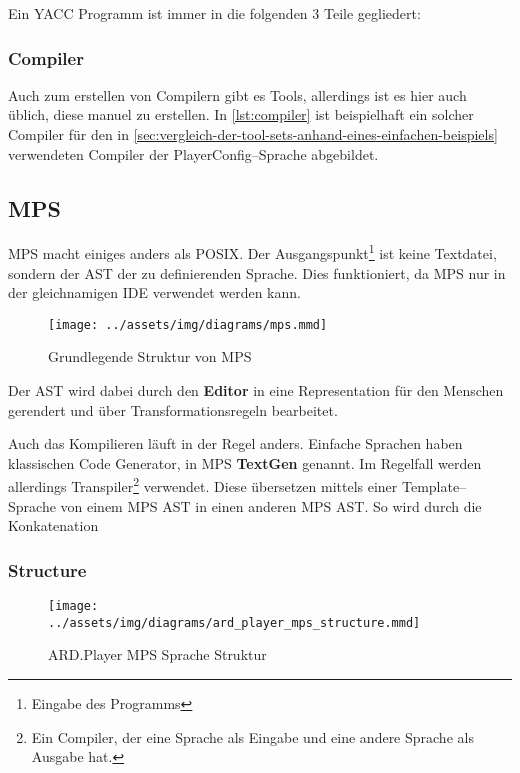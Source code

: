 Ein \ac{YACC} Programm ist immer in die folgenden 3 Teile gegliedert:

\lipsum[5]

\subsubsection{Compiler}
Auch zum erstellen von Compilern gibt es Tools, allerdings ist es hier auch üblich, diese manuel zu erstellen.
In \autoref{lst:compiler} ist beispielhaft ein solcher Compiler für den in \autoref{sec:vergleich-der-tool-sets-anhand-eines-einfachen-beispiels} verwendeten Compiler der PlayerConfig--Sprache abgebildet.

\lipsum[5]

\subsection{\acl{MPS}}\label{subsec:meta-programming-system}
\ac{MPS} macht einiges anders als \ac{POSIX}.
Der Ausgangspunkt\footnote{Eingabe des Programms} ist keine Textdatei, sondern der \ac{AST} der zu definierenden Sprache.
Dies funktioniert, da \ac{MPS} nur in der gleichnamigen \ac{IDE} verwendet werden kann.

\begin{wrapfigure}{lH}{0.5\textwidth}
    \begin{center}
        \texttt{[image: ../assets/img/diagrams/mps.mmd]}
    \end{center}
    \caption{Grundlegende Struktur von \acs{MPS}}
    \label{fig:mps}
\end{wrapfigure}
Der \ac{AST} wird dabei durch den \textbf{Editor} in eine Representation für den Menschen gerendert und über Transformationsregeln bearbeitet.

Auch das Kompilieren läuft in der Regel anders.
Einfache Sprachen haben klassischen Code Generator, in \ac{MPS} \textbf{TextGen} genannt.
Im Regelfall werden allerdings Transpiler\footnote{Ein Compiler, der eine Sprache als Eingabe und eine andere Sprache als Ausgabe hat.} verwendet.
Diese übersetzen mittels einer Template--Sprache von einem \ac{MPS} \ac{AST} in einen anderen \ac{MPS} \ac{AST}.
So wird durch die Konkatenation

\lipsum[5]

\subsubsection{Structure}
\begin{figure}
    \texttt{[image: ../assets/img/diagrams/ard\_player\_mps\_structure.mmd]}
    \caption{ARD.Player MPS Sprache Struktur}
    \label{fig:ard-player-mps-structure}
\end{figure}
\lipsum[5]

